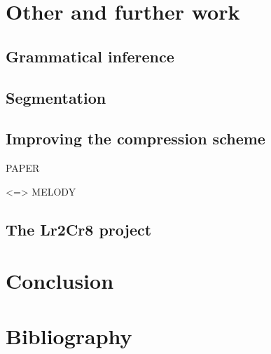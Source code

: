 \documentclass[a4paper,10pt]{article}
\begin{document}
\section{Other and further work}

\subsection{Grammatical inference}

\subsection{Segmentation}

\subsection{Improving the compression scheme}

PAPER

<=> MELODY

\subsection{The Lr2Cr8 project}



\section{Conclusion}





\section{Bibliography}
\nocite{*}



\end{document}
